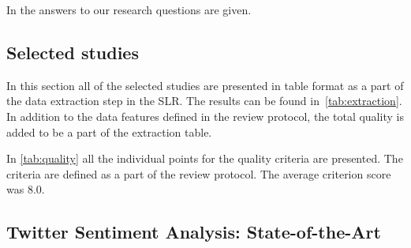In  the answers to our research questions are given. 

\subsection{Selected studies}
\label{sec:selected}

In this section all of the selected studies are presented in table format as a part of the data extraction step in the SLR. The results can be found in~\autoref{tab:extraction}. In addition to the data features defined in the review protocol, the total quality is added to be a part of the extraction table.



In \autoref{tab:quality} all the individual points for the quality criteria are presented. The criteria are defined as a part of the review protocol. The average criterion score was 8.0.



\subsection{Twitter Sentiment Analysis: State-of-the-Art}
\label{sec:stateofart}


